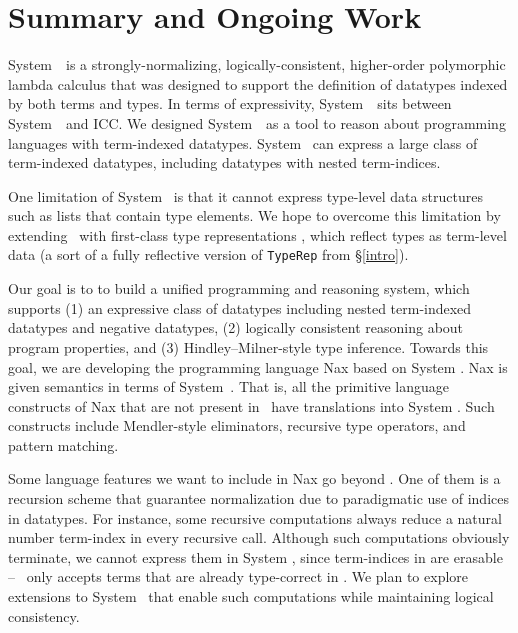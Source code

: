 \section{Summary and Ongoing Work} \label{sec:concl}
System~\Fi\ is a strongly-normalizing, logically-consistent, higher-order
polymorphic lambda calculus that was designed to support the
definition of datatypes indexed by both terms and types.
In terms of expressivity, System~\Fi\ sits between System~\Fw\ and ICC.
We designed System~\Fi\ as a tool to reason about programming
languages with term-indexed datatypes. System \Fi\ can express
a large class of term-indexed datatypes, including datatypes
with nested term-indices.

One limitation of System \Fi\ is that it cannot express type-level
data structures such as lists that contain type elements.
We hope to overcome this limitation by extending \Fi\ 
with first-class type representations \cite{DagMcb12}, which reflect
types as term-level data (a sort of a fully reflective version of
{\small\tt TypeRep} from \S\ref{intro}).

Our goal is to to build a unified programming and reasoning system,
which supports
(1) an expressive class of datatypes including nested term-indexed datatypes
and negative datatypes,
(2) logically consistent reasoning about program properties, and
(3) Hindley--Milner-style type inference.
Towards this goal, we are developing the programming language
Nax \cite{AhnSheFioPit12} based on System \Fi.
Nax is given semantics in terms of System~\Fi.
That is, all the primitive language constructs of Nax that are not present
in \Fi\ have translations into System \Fi. Such constructs include
Mendler-style eliminators, recursive type operators, and
pattern matching.

Some language features we want to include in Nax go beyond \Fi.
One of them is a recursion scheme that guarantee normalization
due to paradigmatic use of indices in datatypes. For instance,
some recursive computations always reduce a natural number term-index
in every recursive call. Although such computations obviously terminate,
we cannot express them in System \Fi, since term-indices in are erasable
-- \Fi\ only accepts terms that are already type-correct in \Fw.
We plan to explore extensions to System \Fi\ that enable such computations
while maintaining logical consistency.

